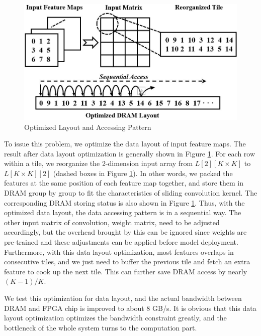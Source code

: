 \documentclass{acm_proc_article-sp-copy}
\begin{document}
\begin{figure}
	\centering
	\includegraphics[width=1.0\linewidth]{./figure/layout.jpg}
	\caption{Optimized Layout and Accessing Pattern}
	\label{datalayout}
\end{figure}

To issue this problem, we optimize the data layout of input feature maps. The result after data layout optimization is generally shown in Figure \ref{datalayout}. For each row within a tile, we reorganize the 2-dimension input array from $L[2][K\times K]$ to $L[K\times K][2]$ (dashed boxes in Figure \ref{datalayout}). In other words, we packed the features at the same position of each feature map together, and store them in DRAM group by group to fit the characteristics of sliding convolution kernel. The corresponding DRAM storing status is also shown in Figure \ref{datalayout}. Thus, with the optimized data layout, the data accessing pattern is in a sequential way. The other input matrix of convolution, weight matrix, need to be adjusted accordingly, but the overhead brought by this can be ignored since weights are pre-trained and these adjustments can be applied before model deployment. Furthermore, with this data layout optimization, most features overlaps in consecutive tiles, and we just need to buffer the previous tile and fetch an extra feature to cook up the next tile. This can further save DRAM access by nearly $(K-1)/K$.

We test this optimization for data layout, and the actual bandwidth between DRAM and FPGA chip is improved to about 8 GB/s.
It is obvious that this data layout optimization optimizes the bandwidth constraint greatly, and the bottleneck of the whole system turns to the computation part.
\end{document}
